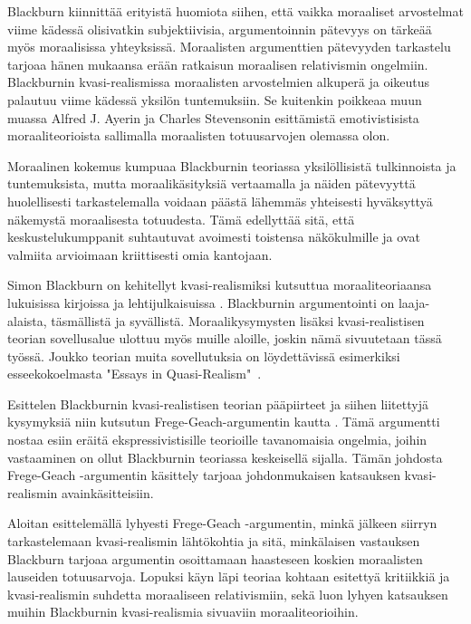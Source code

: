 \documentclass[a4paper,12pt,times,titlepage,finnish]{article}
\begin{document}
Blackburn kiinnittää erityistä huomiota siihen, että vaikka moraaliset arvostelmat viime kädessä olisivatkin subjektiivisia, argumentoinnin pätevyys on tärkeää myös moraalisissa yhteyksissä. Moraalisten argumenttien pätevyyden tarkastelu tarjoaa hänen mukaansa erään ratkaisun moraalisen relativismin ongelmiin. Blackburnin kvasi-\-realismissa moraalisten arvostelmien alkuperä ja oikeutus palautuu viime kädessä yksilön tuntemuksiin. Se kuitenkin poikkeaa muun muassa Alfred J. Ayerin \citep{Ayer36} ja Charles Stevensonin \citep{Stevenson44} esittämistä emotivistisista moraaliteorioista  sallimalla moraalisten totuusarvojen olemassa olon. 

Moraalinen kokemus kumpuaa Blackburnin teoriassa yksilöllisistä tulkinnoista ja tuntemuksista, mutta moraalikäsityksiä vertaamalla ja näiden pätevyyttä huolellisesti tarkastelemalla voidaan päästä lähemmäs yhteisesti hyväksyttyä nä\-ke\-mys\-tä moraalisesta totuudesta. Tä\-mä edellyttää sitä, että keskustelukumppanit suhtautuvat avoimesti toistensa näkökulmille ja ovat valmiita arvioimaan kriittisesti omia kantojaan.

Simon Blackburn on kehitellyt kvasi-\-realismiksi kutsuttua moraaliteoriaansa lukuisissa kirjoissa ja lehtijulkaisuissa \citep[ks. esim.][]{Blackburn84,Blackburn93,Blackburn98,Blackburn99}. Blackburnin argumentointi on laaja-alaista, täsmällistä ja syvällistä. Moraalikysymysten lisäksi kvasi-\-realistisen teorian sovellusalue ulottuu myös muille aloille, joskin nämä sivuutetaan tässä työssä. Joukko teorian muita sovellutuksia on löy\-det\-tä\-vis\-sä esimerkiksi esseekokoelmasta "Essays in Quasi-Realism"\  \citep{Blackburn93}. 

Esittelen Blackburnin kvasi-\-realistisen teorian pääpiirteet ja siihen liitettyjä ky\-sy\-myk\-siä niin kutsutun Frege-\-Geach-\-argumentin kautta \citep[ks.][]{Geach65}. Tämä argumentti nostaa esiin eräitä ekspressivistisille teorioille tavanomaisia ongelmia, joihin vastaaminen on ollut Blackburnin teoriassa keskeisellä sijalla. Tä\-män johdosta Frege-Geach -argumentin käsittely tarjoaa johdonmukaisen katsauksen kvasi-\-realismin avainkäsitteisiin. 

Aloitan esittelemällä lyhyesti Frege-Geach -argu\-men\-tin, minkä jälkeen siirryn tarkastelemaan kvasi-\-realismin lähtökohtia ja sitä, minkä\-laisen vastauksen Blackburn tarjoaa argumentin osoittamaan haasteseen koskien moraalisten lauseiden totuusarvoja. Lopuksi käyn läpi teoriaa kohtaan esitettyä kritiikkiä ja kvasi-\-realismin suhdetta moraaliseen relativismiin, sekä luon lyhyen katsauksen muihin Blackburnin kvasi-\-realismia sivuaviin moraaliteorioihin.
\end{document}
